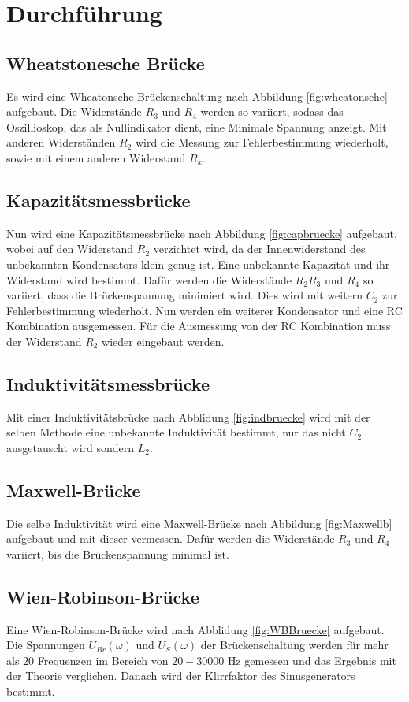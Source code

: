 \section{Durchführung}
\label{sec:Durchführung}
\subsection{Wheatstonesche Brücke}
Es wird eine Wheatonsche Brückenschaltung nach Abbildung \ref{fig:wheatonsche}
aufgebaut. Die Widerstände $R_3$ und $R_4$ werden so variiert, sodass das
Oszillioskop, das als Nullindikator dient, eine Minimale Spannung anzeigt.
Mit anderen Widerständen $R_2$ wird die Messung zur Fehlerbestimmung wiederholt,
sowie mit einem anderen Widerstand $R_x$.
\subsection{Kapazitätsmessbrücke}
Nun wird eine Kapazitätsmessbrücke nach Abbildung \ref{fig:capbruecke} aufgebaut,
wobei auf den Widerstand $R_2$ verzichtet wird, da der Innenwiderstand des
unbekannten Kondensators klein genug ist.
Eine unbekannte Kapazität und ihr Widerstand wird bestimmt. Dafür werden die
Widerstände $R_2R_3$ und $R_4$ so variiert, dass die Brückenspannung minimiert
wird. Dies wird mit weitern $C_2$ zur Fehlerbestimmung wiederholt. Nun werden
ein weiterer Kondensator und eine RC Kombination ausgemessen. Für die Ausmessung
von der RC Kombination muss der Widerstand $R_2$ wieder eingebaut werden.
\subsection{Induktivitätsmessbrücke}
Mit einer Induktivitätsbrücke nach Abblidung \ref{fig:indbruecke} wird mit der
selben Methode eine unbekannte Induktivität bestimmt, nur das nicht $C_2$
ausgetauscht wird sondern $L_2$.
\subsection{Maxwell-Brücke}
Die selbe Induktivität wird eine Maxwell-Brücke nach Abbildung \ref{fig:Maxwellb}
aufgebaut und mit dieser vermessen. Dafür werden die Widerstände $R_3$ und $R_4$
variiert, bis die Brückenspannung minimal ist.
\subsection{Wien-Robinson-Brücke}
Eine Wien-Robinson-Brücke wird nach Abblidung \ref{fig:WBBruecke} aufgebaut. Die
Spannungen $U_{Br}(\omega)$ und $U_{S}(\omega)$ der Brückenschaltung werden für
mehr als $20$ Frequenzen im Bereich von $20-30000$ Hz gemessen und das Ergebnis
mit der Theorie verglichen. Danach wird der Klirrfaktor des Sinusgenerators bestimmt.
